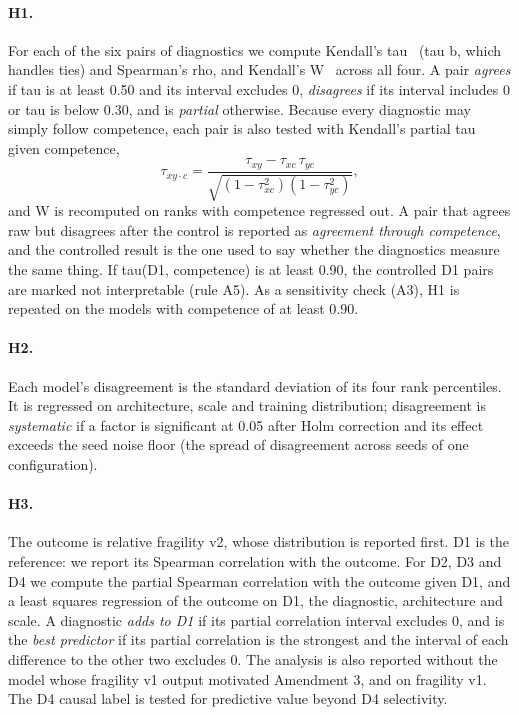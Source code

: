 \documentclass[11pt]{scrartcl}
\begin{document}
\paragraph{H1.} For each of the six pairs of diagnostics we compute Kendall's tau~\cite{kendall1938tau} (tau b,
which handles ties) and Spearman's rho, and Kendall's W~\cite{kendall1939w} across all four. A pair
\emph{agrees} if tau is at least 0.50 and its interval excludes 0, \emph{disagrees} if its interval includes 0
or tau is below 0.30, and is \emph{partial} otherwise. Because every diagnostic may simply follow competence,
each pair is also tested with Kendall's partial tau~\cite{kendall1942partial} given competence,
\[
  \tau_{xy\cdot c}=\frac{\tau_{xy}-\tau_{xc}\,\tau_{yc}}{\sqrt{(1-\tau_{xc}^{2})(1-\tau_{yc}^{2})}} ,
\]
and W is recomputed on ranks with competence regressed out. A pair that agrees raw but disagrees after the
control is reported as \emph{agreement through competence}, and the controlled result is the one used to say
whether the diagnostics measure the same thing. If tau(D1, competence) is at least 0.90, the controlled D1
pairs are marked not interpretable (rule A5). As a sensitivity check (A3), H1 is repeated on the models with
competence of at least 0.90.

\paragraph{H2.} Each model's disagreement is the standard deviation of its four rank percentiles. It is
regressed on architecture, scale and training distribution; disagreement is \emph{systematic} if a factor is
significant at 0.05 after Holm correction and its effect exceeds the seed noise floor (the spread of
disagreement across seeds of one configuration).

\paragraph{H3.} The outcome is relative fragility v2, whose distribution is reported first. D1 is the
reference: we report its Spearman correlation with the outcome. For D2, D3 and D4 we compute the partial
Spearman correlation with the outcome given D1, and a least squares regression of the outcome on D1, the
diagnostic, architecture and scale. A diagnostic \emph{adds to D1} if its partial correlation interval excludes
0, and is the \emph{best predictor} if its partial correlation is the strongest and the interval of each
difference to the other two excludes 0. The analysis is also reported without the model whose fragility v1
output motivated Amendment 3, and on fragility v1. The D4 causal label is tested for predictive value beyond
D4 selectivity.
\end{document}
